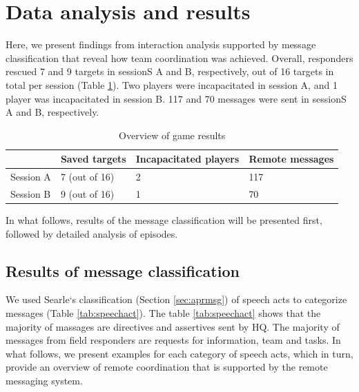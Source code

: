 \section{Data analysis and results}
Here, we present findings from interaction analysis supported by message classification that reveal how team coordination was achieved. Overall, responders rescued 7 and 9 targets in sessionS A and B, respectively, out of 16 targets in total per session (Table \ref{tab:gameResults1}). Two players were incapacitated in session A, and 1 player was incapacitated in session B. 117 and 70 messages were sent in sessionS A and B, respectively.\\

\begin{table}[h]
\footnotesize
\begin{tabular}{llll}
\multicolumn{1}{l|}{} & Saved targets & Incapacitated players & Remote messages \\ \hline
\multicolumn{1}{l|}{Session A} & 7 (out of 16) & 2                    & 117             \\ 
\multicolumn{1}{l|}{Session B} & 9 (out of 16) & 1                    & 70              \\ 
\end{tabular}
\caption{Overview of game results}
\label{tab:gameResults1}
\end{table}


In what follows, results of the message classification will be presented first, followed by detailed analysis of episodes.\\


\subsection{Results of message classification}
We used Searle`s classification (Section \ref{sec:aprmsg}) of speech acts to categorize messages (Table \ref{tab:speechact}). The table \ref{tab:speechact} shows that the majority of massages are directives and assertives sent by HQ. The majority of messages from field responders are requests for information, team and tasks. In what follows, we present examples for each category of speech acts, which in turn, provide an overview of remote coordination that is supported by the remote messaging system. \\

